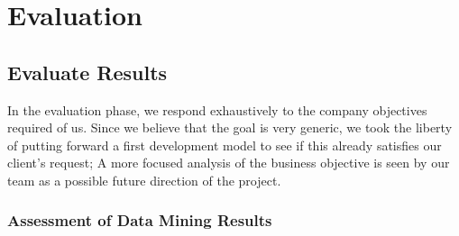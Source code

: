 \chapter{Evaluation}
\section{Evaluate Results}

In the evaluation phase, we respond exhaustively to the company objectives required of us. Since we believe that the goal is very generic, we took the liberty of putting forward a first development model to see if this already satisfies our client's request; A more focused analysis of the business objective is seen by our team as a possible future direction of the project.

\subsection{Assessment of Data Mining Results}

